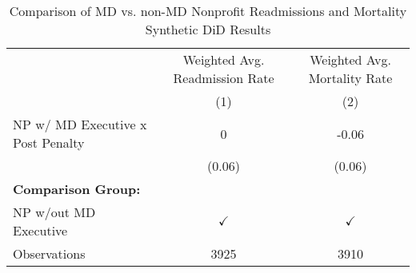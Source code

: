 \begin{table}[ht!]

\caption{\label{tab:MD_noMD_synth}Comparison of MD vs. non-MD Nonprofit Readmissions and Mortality Synthetic DiD Results}
\centering
\begin{tabular}[t]{lcc}
\toprule
\multicolumn{1}{c}{ } & \multicolumn{1}{c}{Weighted Avg. Readmission Rate} & \multicolumn{1}{c}{Weighted Avg. Mortality Rate} \\
\cmidrule(l{3pt}r{3pt}){2-2} \cmidrule(l{3pt}r{3pt}){3-3}
 & (1) & (2)\\
\midrule
NP w/ MD Executive x Post Penalty & 0 & -0.06\\
 & (0.06) & (0.06)\\
\textbf{Comparison Group:} &  & \\
NP w/out MD Executive & $\checkmark$ & $\checkmark$\\
Observations & 3925 & 3910\\
\bottomrule
\end{tabular}
\end{table}
